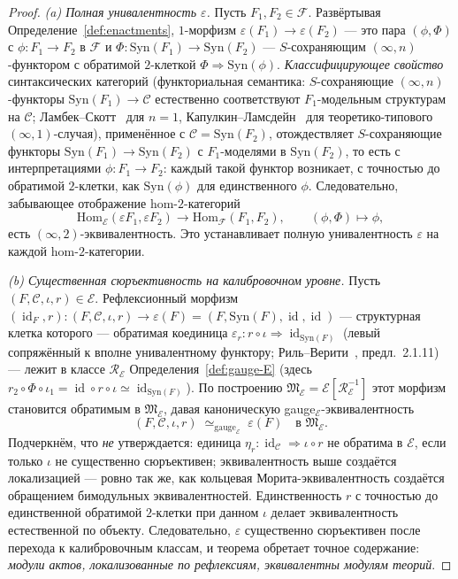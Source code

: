 \documentclass[11pt]{article}
\theoremstyle{plain}
\theoremstyle{definition}
\newcommand{\cF}{\mathcal{F}}
\newcommand{\cC}{\mathcal{C}}
\newcommand{\fM}{\mathfrak{M}}
\newcommand{\Hom}{\mathrm{Hom}}
\newcommand{\Syn}{\mathrm{Syn}}
\newcommand{\cE}{\mathcal{E}}
\DeclareMathOperator{\id}{id}
\begin{document}
\begin{proof}
\emph{(a) Полная унивалентность $\varepsilon$.} Пусть $F_1, F_2 \in \cF$. Развёртывая Определение~\ref{def:enactments}, $1$-морфизм $\varepsilon(F_1) \to \varepsilon(F_2)$ — это пара $(\phi, \Phi)$ с $\phi : F_1 \to F_2$ в $\cF$ и $\Phi : \Syn(F_1) \to \Syn(F_2)$ — $S$-сохраняющим $(\infty, n)$-функтором с обратимой $2$-клеткой $\Phi \Rightarrow \Syn(\phi)$. \emph{Классифицирующее свойство} синтаксических категорий (функториальная семантика: $S$-сохраняющие $(\infty, n)$-функторы $\Syn(F_1) \to \cC$ естественно соответствуют $F_1$-модельным структурам на $\cC$; Ламбек--Скотт~\cite{LambekScott1986} для $n = 1$, Капулкин--Ламсдейн~\cite{KapulkinLumsdaine2021} для теоретико-типового $(\infty, 1)$-случая), применённое с $\cC = \Syn(F_2)$, отождествляет $S$-сохраняющие функторы $\Syn(F_1) \to \Syn(F_2)$ с $F_1$-моделями в $\Syn(F_2)$, то есть с интерпретациями $\phi : F_1 \to F_2$: каждый такой функтор возникает, с точностью до обратимой $2$-клетки, как $\Syn(\phi)$ для единственного $\phi$. Следовательно, забывающее отображение hom-$2$-категорий
\[
  \Hom_{\cE}(\varepsilon F_1, \varepsilon F_2) \longrightarrow \Hom_{\cF}(F_1, F_2), \qquad (\phi, \Phi) \mapsto \phi,
\]
есть $(\infty, 2)$-эквивалентность. Это устанавливает полную унивалентность $\varepsilon$ на каждой hom-$2$-категории.

\emph{(b) Существенная сюръективность на калибровочном уровне.} Пусть $(F, \cC, \iota, r) \in \cE$. Рефлексионный морфизм $(\id_F, r) : (F, \cC, \iota, r) \to \varepsilon(F) = (F, \Syn(F), \id, \id)$ --- структурная клетка которого — обратимая коединица $\varepsilon_r : r \circ \iota \Rightarrow \id_{\Syn(F)}$ (левый сопряжённый к вполне унивалентному функтору; Риль--Верити~\cite{RiehlVerity2022}, предл.~2.1.11) --- лежит в классе $\mathcal{R}_\cE$ Определения~\ref{def:gauge-E} (здесь $r_2 \circ \Phi \circ \iota_1 = \id \circ r \circ \iota \simeq \id_{\Syn(F)}$). По построению $\fM_\cE = \cE[\mathcal{R}_\cE^{-1}]$ этот морфизм становится обратимым в $\fM_\cE$, давая каноническую gauge$_\cE$-эквивалентность
\[
  (F, \cC, \iota, r) \;\simeq_{\mathrm{gauge}_\cE}\; \varepsilon(F) \quad\text{в } \fM_\cE.
\]
Подчеркнём, что \emph{не} утверждается: единица $\eta_r : \id_\cC \Rightarrow \iota \circ r$ не обратима в $\cE$, если только $\iota$ не существенно сюръективен; эквивалентность выше создаётся локализацией — ровно так же, как кольцевая Морита-эквивалентность создаётся обращением бимодульных эквивалентностей. Единственность $r$ с точностью до единственной обратимой $2$-клетки при данном $\iota$ делает эквивалентность естественной по объекту. Следовательно, $\varepsilon$ существенно сюръективен после перехода к калибровочным классам, и теорема обретает точное содержание: \emph{модули актов, локализованные по рефлексиям, эквивалентны модулям теорий}.


\end{proof}
\end{document}

